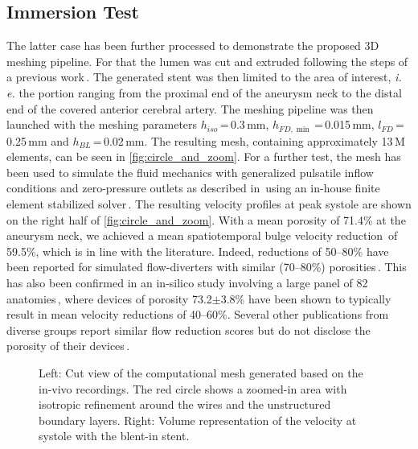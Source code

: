 \subsection{Immersion Test}
The latter case has been further processed to demonstrate the proposed 3D meshing pipeline. For that the lumen was cut and extruded following the steps of a previous work\,\cite{Jeken-Rico2023}. The generated stent was then limited to the area of interest, \textit{i.\,e.} the portion ranging from the proximal end of the aneurysm neck to the distal end of the covered anterior cerebral artery. The meshing pipeline was then launched with the meshing parameters $h_{iso}$\,=\,0.3\,mm, $h_{FD, \min}$\,=\,0.015\,mm, $l_{FD}$\,=\,0.25\,mm and $h_{BL}$\,=\,0.02\,mm. The resulting mesh, containing approximately 13\,M elements, can be seen in \autoref{fig:circle_and_zoom}. For a further test, the mesh has been used to simulate the fluid mechanics with generalized pulsatile inflow conditions and zero-pressure outlets as described in\,\cite{Jeken-Rico2023} using an in-house finite element stabilized solver\,\cite{Hachem2010}. The resulting velocity profiles at peak systole are shown on the right half of \autoref{fig:circle_and_zoom}. With a mean porosity of 71.4\% at the aneurysm neck, we achieved a mean spatiotemporal bulge velocity reduction\,\cite{Larrabide2016} of 59.5\%, which is in line with the literature. Indeed, reductions of 50--80\% have been reported for simulated flow-diverters with similar (70--80\%) porosities\,\cite{Suzuki999}. This has also been confirmed in an in-silico study involving a large panel of 82 anatomies\,\cite{Sarrami-Foroushani2021}, where devices of porosity 73.2$\pm$3.8\% have been shown to typically result in mean velocity reductions of 40--60\%. Several other publications from diverse groups report similar flow reduction scores but do not disclose the porosity of their devices\,\cite{Janiga2015, Sindeev2018}.
\begin{figure}[ht]
	\centering
	\vspace*{-0.25cm}
	
	\vspace*{-0.75cm}
	\caption[Resulting mesh and fluid dynamics of the patient case]{Left: Cut view of the computational mesh generated based on the in-vivo recordings. The red circle shows a zoomed-in area with isotropic refinement around the wires and the unstructured boundary layers. Right: Volume representation of the velocity at systole with the blent-in stent.}\label{fig:circle_and_zoom}
\end{figure}

